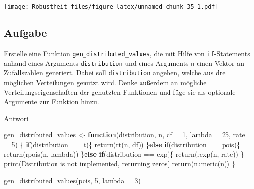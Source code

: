 \documentclass[
]{book}
\newenvironment{Shaded}{\begin{snugshade}}{\end{snugshade}}
\newcommand{\AttributeTok}[1]{\textcolor[rgb]{0.77,0.63,0.00}{#1}}
\newcommand{\ControlFlowTok}[1]{\textcolor[rgb]{0.13,0.29,0.53}{\textbf{#1}}}
\newcommand{\DecValTok}[1]{\textcolor[rgb]{0.00,0.00,0.81}{#1}}
\newcommand{\FunctionTok}[1]{\textcolor[rgb]{0.00,0.00,0.00}{#1}}
\newcommand{\NormalTok}[1]{#1}
\newcommand{\OtherTok}[1]{\textcolor[rgb]{0.56,0.35,0.01}{#1}}
\newcommand{\SpecialCharTok}[1]{\textcolor[rgb]{0.00,0.00,0.00}{#1}}
\newcommand{\StringTok}[1]{\textcolor[rgb]{0.31,0.60,0.02}{#1}}
\begin{document}
\texttt{[image: Robustheit\_files/figure-latex/unnamed-chunk-35-1.pdf]}

\hypertarget{aufgabe-3}{%
\subsection{Aufgabe}\label{aufgabe-3}}

Erstelle eine Funktion \texttt{gen\_distributed\_values}, die mit Hilfe von \texttt{if}-Statements anhand eines Arguments \texttt{distribution} und eines Arguments \texttt{n} einen Vektor an Zufallszahlen generiert. Dabei soll \texttt{distribution} angeben, welche aus drei möglichen Verteilungen genutzt wird. Denke außerdem an mögliche Verteilungseigenschaften der genutzten Funktionen und füge sie als optionale Argumente zur Funktion hinzu.

Antwort

\begin{Shaded}
\begin{Highlighting}[]
\NormalTok{gen\_distributed\_values }\OtherTok{\textless{}{-}} \ControlFlowTok{function}\NormalTok{(distribution,}
\NormalTok{                                   n,}
                                   \AttributeTok{df =} \DecValTok{1}\NormalTok{,}
                                   \AttributeTok{lambda =} \DecValTok{25}\NormalTok{,}
                                   \AttributeTok{rate =} \DecValTok{5}\NormalTok{) \{}
  \ControlFlowTok{if}\NormalTok{(distribution }\SpecialCharTok{==} \StringTok{\textquotesingle{}t\textquotesingle{}}\NormalTok{)\{}
    \FunctionTok{return}\NormalTok{(}\FunctionTok{rt}\NormalTok{(n, df))}
\NormalTok{  \}}\ControlFlowTok{else} \ControlFlowTok{if}\NormalTok{(distribution }\SpecialCharTok{==} \StringTok{\textquotesingle{}pois\textquotesingle{}}\NormalTok{)\{}
    \FunctionTok{return}\NormalTok{(}\FunctionTok{rpois}\NormalTok{(n, lambda))}
\NormalTok{  \}}\ControlFlowTok{else} \ControlFlowTok{if}\NormalTok{(distribution }\SpecialCharTok{==} \StringTok{\textquotesingle{}exp\textquotesingle{}}\NormalTok{)\{}
    \FunctionTok{return}\NormalTok{(}\FunctionTok{rexp}\NormalTok{(n, rate))}
\NormalTok{  \}}
  \FunctionTok{print}\NormalTok{(}\StringTok{\textquotesingle{}Distribution is not implemented, returning zeros\textquotesingle{}}\NormalTok{)}
  \FunctionTok{return}\NormalTok{(}\FunctionTok{numeric}\NormalTok{(n))}
\NormalTok{\}}

\FunctionTok{gen\_distributed\_values}\NormalTok{(}\StringTok{\textquotesingle{}pois\textquotesingle{}}\NormalTok{,}
                       \DecValTok{5}\NormalTok{,}
                       \AttributeTok{lambda =} \DecValTok{3}\NormalTok{)}
\end{Highlighting}
\end{Shaded}
\end{document}
